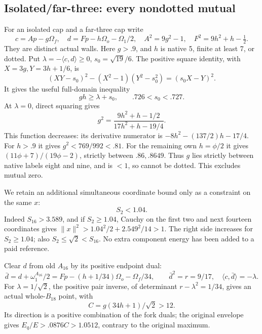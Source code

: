 \documentclass[11pt]{article}
\theoremstyle{definition}
\theoremstyle{remark}
\newcommand{\ip}[2]{\langle #1,#2\rangle}
\newcommand{\norm}[1]{\lVert #1\rVert}
\begin{document}
\subsection{Isolated/far-three: every nondotted mutual}
\label{app:D18isolatedfarfinite}

For an isolated cap and a far-three cap write
\[
 c=Ap-g\Omega_f,\quad
 d=Fp-h\Omega_o-\Omega_1/2,\quad
 A^2=9g^2-1,\quad F^2=9h^2+h-\tfrac12 .
\]
They are distinct actual walls.  Here \(g>.9\), and \(h\) is
native 5, finite at least 7, or dotted.
Put \(\lambda=-\ip cd\ge0\), \(s_0=\sqrt{19}/6\).
The positive square identity, with
\(X=3g,Y=3h+1/6\), is
\[
 (XY-s_0)^2-(X^2-1)(Y^2-s_0^2)=(s_0X-Y)^2 .
\]
It gives the useful full-domain inequality
\[
                       gh\ge\lambda+s_0,\qquad
                       .726<s_0<.727.
\tag{DIFproduct}\label{eq:DIFproduct}
\]
At \(\lambda=0\), direct squaring gives
\[
 g^2={\frac{9h^2+h-1/2}{17h^2+h-19/4}}.
\]
This function decreases: its derivative numerator is
\(-8h^2-(137/2)h-17/4\).
For \(h>.9\) it gives \(g^2<769/992<.81\).
For the remaining own \(h=\phi/2\) it gives
\((11\phi+7)/(19\phi-2)\), strictly between \(.86,.8649\).
Thus \(g\) lies strictly between native labels eight and nine,
and is \(<1\), so cannot be dotted.  This excludes mutual zero.

We retain an additional simultaneous coordinate bound only as a
constraint on the same \(x\):
\[
                            S_2<1.04 .
\tag{DIFS2}\label{eq:DIFS2}
\]
Indeed \(S_{16}>3.589\), and if \(S_2\ge1.04\), Cauchy on
the first two and next fourteen coordinates gives
\(\norm x^2>1.04^2/2+2.549^2/14>1\).
The right side increases for \(S_2\ge1.04\);
also \(S_2\le\sqrt2<S_{16}\).
No extra component energy has been added to a paid reference.

Clear \(d\) from old \(A_{16}\) by its positive endpoint dual:
\[
 \bar d=d+\omega_1^{A_{16}}/2
       =Fp-(h+1/34)\Omega_o-\Omega_f/34,\qquad
 \bar d^2=r=9/17,\quad \ip c{\bar d}=-\lambda.
\]
For \(\lambda=1/\sqrt2\), the positive pair inverse, of determinant
\(r-\lambda^2=1/34\), gives an actual whole-\(B_{18}\) point,
with
\[
                          C=g(34h+1)/\sqrt2>12 .
\]
Its direction is a positive combination of the fork duals;
the original envelope gives \(E_q/E>.0876C>1.0512\),
contrary to the original maximum.
\end{document}
